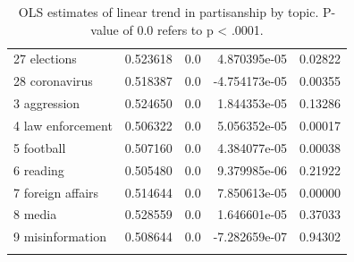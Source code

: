 \documentclass{article}
\begin{document}
\begin{longtable}{lrrrr}
	27 elections               &  0.523618 &     0.0 &  4.870395e-05 &  0.02822 \\
	28 coronavirus             &  0.518387 &     0.0 & -4.754173e-05 &  0.00355 \\
	3 aggression               &  0.524650 &     0.0 &  1.844353e-05 &  0.13286 \\
	4 law enforcement          &  0.506322 &     0.0 &  5.056352e-05 &  0.00017 \\
	5 football                 &  0.507160 &     0.0 &  4.384077e-05 &  0.00038 \\
	6 reading                  &  0.505480 &     0.0 &  9.379985e-06 &  0.21922 \\
	7 foreign affairs          &  0.514644 &     0.0 &  7.850613e-05 &  0.00000 \\
	8 media                    &  0.528559 &     0.0 &  1.646601e-05 &  0.37033 \\
	9 misinformation           &  0.508644 &     0.0 & -7.282659e-07 &  0.94302 \\
	\bottomrule
\caption{OLS estimates of linear trend in partisanship by topic. P-value of 0.0 refers to p < .0001.}
\label{tab:polarization_topics_ols}
\end{longtable}

\clearpage
\end{document}
